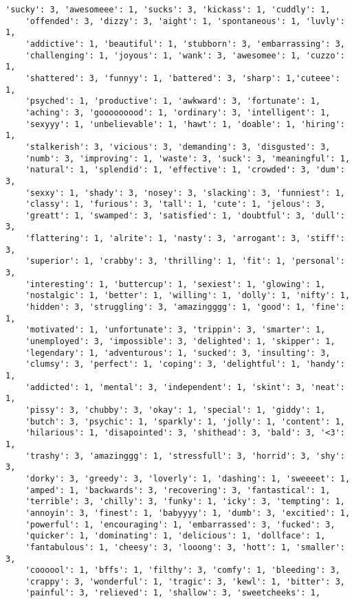 \begin{lstlisting}[caption={\textit{sentiment\_words.py}: sentiment words}]
    'sucky': 3, 'awesomeee': 1, 'sucks': 3, 'kickass': 1, 'cuddly': 1,
    'offended': 3, 'dizzy': 3, 'aight': 1, 'spontaneous': 1, 'luvly': 1,
    'addictive': 1, 'beautiful': 1, 'stubborn': 3, 'embarrassing': 3,
    'challenging': 1, 'joyous': 1, 'wank': 3, 'awesomee': 1, 'cuzzo': 1,
    'shattered': 3, 'funnyy': 1, 'battered': 3, 'sharp': 1,'cuteee': 1,
    'psyched': 1, 'productive': 1, 'awkward': 3, 'fortunate': 1,
    'aching': 3, 'gooooooood': 1, 'ordinary': 3, 'intelligent': 1,
    'sexyyy': 1, 'unbelievable': 1, 'hawt': 1, 'doable': 1, 'hiring': 1,
    'stalkerish': 3, 'vicious': 3, 'demanding': 3, 'disgusted': 3,
    'numb': 3, 'improving': 1, 'waste': 3, 'suck': 3, 'meaningful': 1,
    'natural': 1, 'splendid': 1, 'effective': 1, 'crowded': 3, 'dum': 3,
    'sexxy': 1, 'shady': 3, 'nosey': 3, 'slacking': 3, 'funniest': 1,
    'classy': 1, 'furious': 3, 'tall': 1, 'cute': 1, 'jelous': 3,
    'greatt': 1, 'swamped': 3, 'satisfied': 1, 'doubtful': 3, 'dull': 3,
    'flattering': 1, 'alrite': 1, 'nasty': 3, 'arrogant': 3, 'stiff': 3,
    'superior': 1, 'crabby': 3, 'thrilling': 1, 'fit': 1, 'personal': 3,
    'interesting': 1, 'buttercup': 1, 'sexiest': 1, 'glowing': 1,
    'nostalgic': 1, 'better': 1, 'willing': 1, 'dolly': 1, 'nifty': 1,
    'hidden': 3, 'struggling': 3, 'amazingggg': 1, 'good': 1, 'fine': 1,
    'motivated': 1, 'unfortunate': 3, 'trippin': 3, 'smarter': 1,
    'unemployed': 3, 'impossible': 3, 'delighted': 1, 'skipper': 1,
    'legendary': 1, 'adventurous': 1, 'sucked': 3, 'insulting': 3,
    'clumsy': 3, 'perfect': 1, 'coping': 3, 'delightful': 1, 'handy': 1,
    'addicted': 1, 'mental': 3, 'independent': 1, 'skint': 3, 'neat': 1,
    'pissy': 3, 'chubby': 3, 'okay': 1, 'special': 1, 'giddy': 1,
    'butch': 3, 'psychic': 1, 'sparkly': 1, 'jolly': 1, 'content': 1,
    'hilarious': 1, 'disapointed': 3, 'shithead': 3, 'bald': 3, '<3': 1,
    'trashy': 3, 'amazinggg': 1, 'stressfull': 3, 'horrid': 3, 'shy': 3,
    'dorky': 3, 'greedy': 3, 'loverly': 1, 'dashing': 1, 'sweeeet': 1,
    'amped': 1, 'backwards': 3, 'recovering': 3, 'fantastical': 1,
    'terrible': 3, 'chilly': 3, 'funky': 1, 'icky': 3, 'tempting': 1,
    'annoyin': 3, 'finest': 1, 'babyyyy': 1, 'dumb': 3, 'excitied': 1,
    'powerful': 1, 'encouraging': 1, 'embarrassed': 3, 'fucked': 3,
    'quicker': 1, 'dominating': 1, 'delicious': 1, 'dollface': 1,
    'fantabulous': 1, 'cheesy': 3, 'looong': 3, 'hott': 1, 'smaller': 3,
    'coooool': 1, 'bffs': 1, 'filthy': 3, 'comfy': 1, 'bleeding': 3,
    'crappy': 3, 'wonderful': 1, 'tragic': 3, 'kewl': 1, 'bitter': 3,
    'painful': 3, 'relieved': 1, 'shallow': 3, 'sweetcheeks': 1,

\end{lstlisting}
